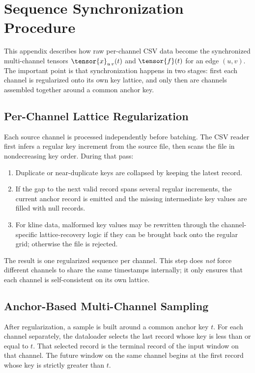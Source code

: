 \section{Sequence Synchronization Procedure}
\label{app:sequence-synchronization}

This appendix describes how raw per-channel CSV data become the synchronized
multi-channel tensors $\tensor{x}_{u\,v}(t)$ and $\tensor{f}(t)$ for an edge
$(u,v)$.  The important point is
that synchronization happens in two stages: first each channel is regularized
onto its own key lattice, and only then are channels assembled together around
a common anchor key.

\subsection{Per-Channel Lattice Regularization}
\label{appsub:per-channel-lattice-regularization}

Each source channel is processed independently before batching.  The CSV reader
first infers a regular key increment from the source file, then scans the file
in nondecreasing key order.  During that pass:
\begin{enumerate}
\item Duplicate or near-duplicate keys are collapsed by keeping the latest
record.
\item If the gap to the next valid record spans several regular increments, the
current anchor record is emitted and the missing intermediate key values are
filled with null records.
\item For kline data, malformed key values may be rewritten through the
channel-specific lattice-recovery logic if they can be brought back onto the
regular grid; otherwise the file is rejected.
\end{enumerate}

The result is one regularized sequence per channel.  This step does
\emph{not} force different channels to share the same timestamps internally;
it only ensures that each channel is self-consistent on its own lattice.

\subsection{Anchor-Based Multi-Channel Sampling}
\label{appsub:anchor-based-multi-channel-sampling}

After regularization, a sample is built around a common anchor key $t$.  For
each channel separately, the dataloader selects the last record whose key is
less than or equal to $t$.  That selected record is the terminal record of the
input window on that channel.  The future window on the same channel begins at
the first record whose key is strictly greater than $t$.

